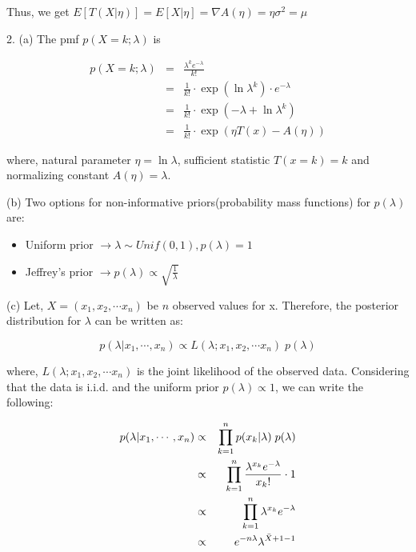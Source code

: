 \documentclass[11pt]{article}
\begin{document}
\par Thus, we get $E[T(X|\eta)] = E[X|\eta] = \nabla A(\eta) = \eta\sigma^2 = \mu$

\par 2. (a)  The pmf $p(X=k;\lambda)$ is

\vspace{-8pt}
\begin{eqnarray*}
   p(X=k; \lambda) &=& \frac{\lambda^k e^{-\lambda}}{k!} \\
&=& \frac{1}{k!} \cdot \exp( \ln \lambda^k) \cdot e^{-\lambda} \\
&=& \frac{1}{k!} \cdot \exp(-\lambda + \ln \lambda^k) \\
&=& \frac{1}{k!} \cdot \exp(\eta T(x) - A(\eta) )
\end{eqnarray*}

where, natural parameter $\eta = \ln \lambda$, sufficient statistic $T(x=k) = k$ and normalizing constant $A(\eta) = \lambda$.

\par (b)  Two options for non-informative priors(probability mass functions) for $p(\lambda)$ are:
\begin{itemize}
 \item Uniform prior $\rightarrow \lambda \sim Unif(0,1), p(\lambda) = 1$
 \item Jeffrey's prior $\rightarrow p(\lambda) \propto \sqrt{ \frac{1}{\lambda} }$
\end{itemize}

\par (c) Let, $X=(x_1,x_2,\cdots x_n)$ be $n$ observed values for x. Therefore, the posterior distribution for $\lambda$ can be written as:

\vspace{-10pt}
\begin{equation*}
  p(\lambda | x_1, \cdots, x_n) \propto L(\lambda; x_1, x_2, \cdots x_n) \; p(\lambda) 
\end{equation*}

where, $L(\lambda; x_1, x_2, \cdots x_n)$ is the joint likelihood of the observed data. Considering that the data is i.i.d. and the uniform prior $p(\lambda) \propto 1$, we can write the following:

\vspace{-20pt}
\begin{eqnarray}
  p(\lambda | x_1, \cdots, x_n) &\propto& \prod_{k=1}^{n} p(x_k | \lambda) \; p(\lambda)  \notag \\
&\propto& \prod_{k=1}^{n} \frac{\lambda^{x_k}e^{-\lambda}}{x_{k}!} \cdot 1 \notag  \\
&\propto& \prod_{k=1}^{n} \lambda^{x_k} e^{-\lambda} \notag \\
&\propto& e^{-n\lambda} \lambda^{\bar{X}+1-1} 
\label{eq2c}
\end{eqnarray}
\end{document}
